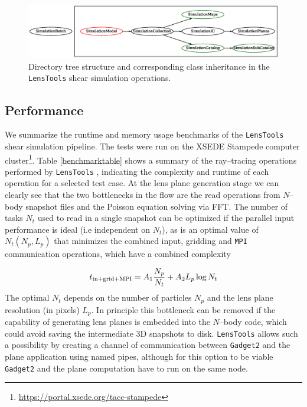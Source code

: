 \documentclass[5p]{elsarticle}
\newcommand{\ttt}[1]{\texttt{#1}}
\newcommand{\LT}{\texttt{LensTools} }
\begin{document}
\begin{figure}
\includegraphics[scale=0.6]{Figures/inheritance.eps}
\caption{Directory tree structure and corresponding class inheritance in the \LT shear simulation operations.}
\label{inheritance}
\end{figure}

\subsection{Performance}
%
We summarize the runtime and memory usage benchmarks of the \LT shear simulation pipeline. The tests were run on the XSEDE Stampede computer cluster\footnote{\url{https://portal.xsede.org/tacc-stampede}}. Table \ref{benchmarktable} shows a summary of the ray--tracing operations performed by \LT, indicating the complexity and runtime of each operation for a selected test case. At the lens plane generation stage we can clearly see that the two bottlenecks in the flow are the read operations from $N$--body snapshot files and the Poisson equation solving via FFT. The number of tasks $N_t$ used to read in a single snapshot can be optimized if the parallel input performance is ideal (i.e independent on $N_t$), as is an optimal value of $N_t(N_p,L_p)$ that minimizes the combined input, gridding and \ttt{MPI} communication operations, which have a combined complexity

\begin{equation}
t_{\rm in+grid+MPI} = A_1\frac{N_p}{N_t} + A_2L_p\log{N_t}
\end{equation} 
%
The optimal $N_t$ depends on the number of particles $N_p$ and the lens plane resolution (in pixels) $L_p$. In principle this bottleneck can be removed if the capability of generating lens planes is embedded into the $N$--body code, which could avoid saving the intermediate 3D snapshots to disk. \LT allows such a possibility by creating a channel of communication between \ttt{Gadget2} and the plane application using named pipes, although for this option to be viable \ttt{Gadget2} and the plane computation have to run on the same node. 
\end{document}
